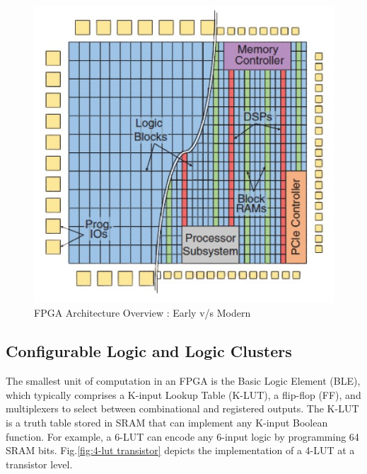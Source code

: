 \begin{figure}
	\centerline{\includegraphics[scale = 0.6]{Figures/fpga_architecture.jpg}}
	\caption{FPGA Architecture Overview : Early v/s Modern\cite{boutros2021fpga}}
	\label{fig:fpga architecture}
\end{figure}

\subsection{Configurable Logic and Logic Clusters}
The smallest unit of computation in an FPGA is the Basic Logic Element (BLE), which typically comprises a K-input Lookup Table (K-LUT), a flip-flop (FF), and multiplexers to select between combinational and registered outputs. The K-LUT is a truth table stored in SRAM that can implement any K-input Boolean function. For example, a 6-LUT can encode any 6-input logic by programming 64 SRAM bits. Fig.\ref{fig:4-lut transistor} depicts the implementation of a 4-LUT at a transistor level.

